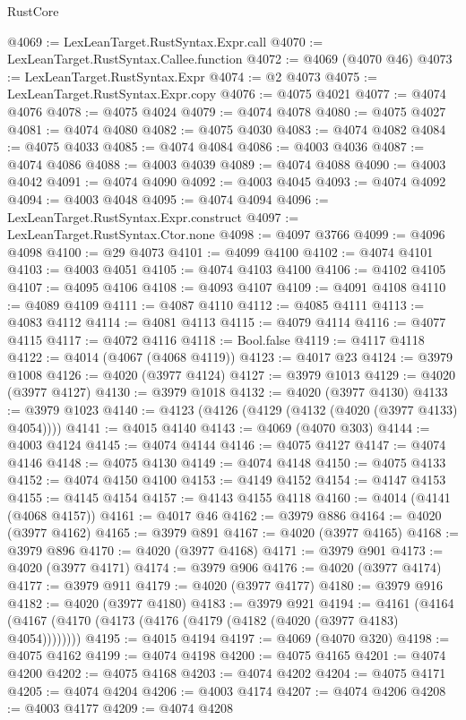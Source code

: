 \begin{lexlean}{RustCore}
\begin{coremodule}
@4069 := LexLeanTarget.RustSyntax.Expr.call
@4070 := LexLeanTarget.RustSyntax.Callee.function
@4072 := @4069 (@4070 @46)
@4073 := LexLeanTarget.RustSyntax.Expr
@4074 := @2 @4073
@4075 := LexLeanTarget.RustSyntax.Expr.copy
@4076 := @4075 @4021
@4077 := @4074 @4076
@4078 := @4075 @4024
@4079 := @4074 @4078
@4080 := @4075 @4027
@4081 := @4074 @4080
@4082 := @4075 @4030
@4083 := @4074 @4082
@4084 := @4075 @4033
@4085 := @4074 @4084
@4086 := @4003 @4036
@4087 := @4074 @4086
@4088 := @4003 @4039
@4089 := @4074 @4088
@4090 := @4003 @4042
@4091 := @4074 @4090
@4092 := @4003 @4045
@4093 := @4074 @4092
@4094 := @4003 @4048
@4095 := @4074 @4094
@4096 := LexLeanTarget.RustSyntax.Expr.construct
@4097 := LexLeanTarget.RustSyntax.Ctor.none
@4098 := @4097 @3766
@4099 := @4096 @4098
@4100 := @29 @4073
@4101 := @4099 @4100
@4102 := @4074 @4101
@4103 := @4003 @4051
@4105 := @4074 @4103 @4100
@4106 := @4102 @4105
@4107 := @4095 @4106
@4108 := @4093 @4107
@4109 := @4091 @4108
@4110 := @4089 @4109
@4111 := @4087 @4110
@4112 := @4085 @4111
@4113 := @4083 @4112
@4114 := @4081 @4113
@4115 := @4079 @4114
@4116 := @4077 @4115
@4117 := @4072 @4116
@4118 := Bool.false
@4119 := @4117 @4118
@4122 := @4014 (@4067 (@4068 @4119))
@4123 := @4017 @23
@4124 := @3979 @1008
@4126 := @4020 (@3977 @4124)
@4127 := @3979 @1013
@4129 := @4020 (@3977 @4127)
@4130 := @3979 @1018
@4132 := @4020 (@3977 @4130)
@4133 := @3979 @1023
@4140 := @4123 (@4126 (@4129 (@4132 (@4020 (@3977 @4133) @4054))))
@4141 := @4015 @4140
@4143 := @4069 (@4070 @303)
@4144 := @4003 @4124
@4145 := @4074 @4144
@4146 := @4075 @4127
@4147 := @4074 @4146
@4148 := @4075 @4130
@4149 := @4074 @4148
@4150 := @4075 @4133
@4152 := @4074 @4150 @4100
@4153 := @4149 @4152
@4154 := @4147 @4153
@4155 := @4145 @4154
@4157 := @4143 @4155 @4118
@4160 := @4014 (@4141 (@4068 @4157))
@4161 := @4017 @46
@4162 := @3979 @886
@4164 := @4020 (@3977 @4162)
@4165 := @3979 @891
@4167 := @4020 (@3977 @4165)
@4168 := @3979 @896
@4170 := @4020 (@3977 @4168)
@4171 := @3979 @901
@4173 := @4020 (@3977 @4171)
@4174 := @3979 @906
@4176 := @4020 (@3977 @4174)
@4177 := @3979 @911
@4179 := @4020 (@3977 @4177)
@4180 := @3979 @916
@4182 := @4020 (@3977 @4180)
@4183 := @3979 @921
@4194 := @4161 (@4164 (@4167 (@4170 (@4173 (@4176 (@4179 (@4182 (@4020 (@3977 @4183) @4054))))))))
@4195 := @4015 @4194
@4197 := @4069 (@4070 @320)
@4198 := @4075 @4162
@4199 := @4074 @4198
@4200 := @4075 @4165
@4201 := @4074 @4200
@4202 := @4075 @4168
@4203 := @4074 @4202
@4204 := @4075 @4171
@4205 := @4074 @4204
@4206 := @4003 @4174
@4207 := @4074 @4206
@4208 := @4003 @4177
@4209 := @4074 @4208

\end{coremodule}
\end{lexlean}
